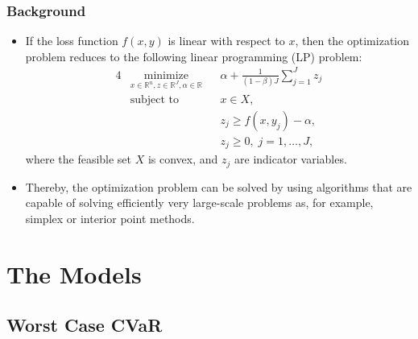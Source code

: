 \documentclass[pdf,10pt,xcolor=dvipsnames,hide notes]{beamer}
\begin{document}
\begin{frame}[label=frame2b8]
	\frametitle{Background}
	
	\begin{itemize}
		\setlength{\parskip}{15pt}
		\justifying
		
		\item If the loss function $f(x,y)$ is linear with respect to \thinspace $x$, then the optimization problem reduces to the following linear programming (LP) problem:%
		\begin{alignat}{4}
		& \underset{x \in \mathbb{R}^{n},z\in 	\mathbb{R}^{J},\alpha \in \mathbb{R}}{\text{minimize}}
		& & \alpha +\frac{1}{\left( 1-\beta \right)  J}\sum_{j=1}^{J}z_{j}
		\\ 
		& \text{subject to} 
		& & x\in X,\\
		&&& z_{j}\geq f(x,y_{j})-\alpha , \\
		&&& z_{j}\geq 0, \; j = 1, \ldots, J,
		\end{alignat}
		where the feasible set $X$ is convex, and $z_{j}$ are indicator variables.
	
\item Thereby, the optimization problem can be solved by using algorithms that are capable of solving efficiently very large-scale problems as, for example, simplex or interior point methods.

	\end{itemize}
\end{frame}
	
\section{The Models}
\subsection{Worst Case CVaR}
\end{document}

